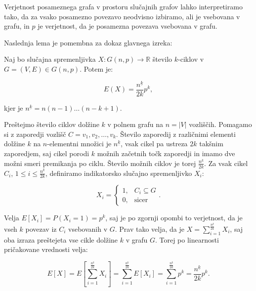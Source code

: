 \documentclass[mat1, tisk]{fmfdelo}
\begin{document}
    \begin{opomba}
        Verjetnost posameznega grafa v prostoru slučajnih grafov lahko interpretiramo tako, da za vsako posamezno povezavo neodvisno izbiramo, ali je vsebovana v grafu, in $p$ je verjetnost, da je posamezna povezava vsebovana v grafu.
    \end{opomba}

Naslednja lema je pomembna za dokaz glavnega izreka:

    \begin{lema}
        Naj bo slučajna spremenljivka $X : G(n, p) \to \mathbb{R}$ število $k$-ciklov v $G = (V, E) \in G(n, p)$. Potem je:

        $$E(X) = \frac{n^{\underline{k}}}{2k}p^k,$$

        kjer je $n^{\underline{k}} = n(n-1)\ldots(n-k+1)$.
    \end{lema}

    \begin{dokaz}
        Preštejmo število ciklov dolžine $k$ v polnem grafu na $n = |V|$ vozliščih. Pomagamo si z zaporedji vozlišč $C = v_1,v_2,\ldots,v_k$. Število zaporedij z različnimi elementi dolžine $k$ na $n$-elementni množici je $n^{\underline{k}}$, vsak cikel
        pa ustreza $2k$ takšnim zaporedjem, saj cikel porodi $k$ možnih začetnih točk zaporedji in imamo dve možni smeri premikanja po ciklu. Število možnih ciklov je torej $\frac{n^{\underline{k}}}{2k}$. Za vsak cikel $C_i$, $1 \leq i \leq \frac{n^{\underline{k}}}{2k}$,
        definiramo indikatorsko slučajno spremenljivko $X_i$:

        $$X_i = \begin{cases}
            1, & C_i \subseteq G \\
            0, & \text{sicer}
        \end{cases}.$$

        Velja $E[X_i] = P(X_i = 1) = p^k$, saj je po zgornji opombi to verjetnost, da je vseh $k$ povezav iz $C_i$ vsebovanih v $G$. Prav tako velja, da je $X = \sum_{i=1}^{\frac{n^{\underline{k}}}{2k}}X_i$, saj oba izraza preštejeta vse cikle dolžine $k$
        v grafu $G$. Torej po linearnosti pričakovane vrednosti velja:

        $$E[X] = E[\sum_{i=1}^{\frac{n^{\underline{k}}}{2k}}X_i] = \sum_{i=1}^{\frac{n^{\underline{k}}}{2k}}E[X_i] = \sum_{i=1}^{\frac{n^{\underline{k}}}{2k}}p^k = \frac{n^{\underline{k}}}{2k}p^k.$$
    \end{dokaz}

\end{document}
